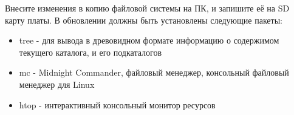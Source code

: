 Внесите изменения в копию файловой системы на ПК, и запишите её на SD карту платы. В обновлении должны быть установлены следующие пакеты:
\begin{itemize}
	\item tree - для вывода в древовидном формате информацию о содержимом текущего каталога, и его подкаталогов
	
	\item mc - Midnight Commander, файловый менеджер, консольный файловый менеджер для Linux
	
	\item htop - интерактивный консольный монитор ресурсов
\end{itemize}
 
